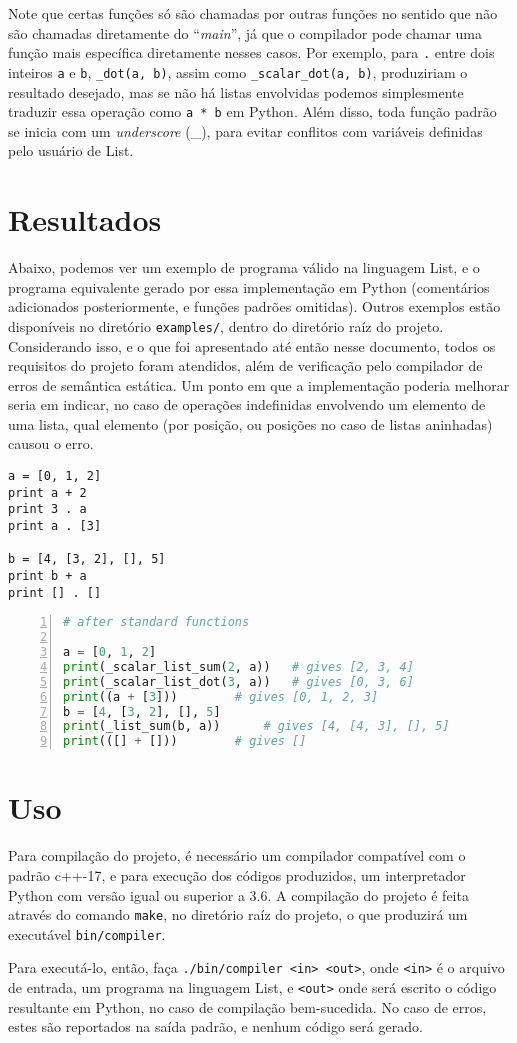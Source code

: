 \documentclass{article}
\begin{document}
Note que certas funções só são chamadas por outras funções no sentido que não são chamadas diretamente do ``\textit{main}'', já que o compilador pode chamar uma função mais específica diretamente nesses casos. Por exemplo, para \texttt{.} entre dois inteiros \texttt{a} e \texttt{b}, \texttt{\_dot(a, b)}, assim como \texttt{\_scalar\_dot(a, b)}, produziriam o resultado desejado, mas se não há listas envolvidas podemos simplesmente traduzir essa operação como \texttt{a * b} em Python. Além disso, toda função padrão se inicia com um \textit{underscore} (\_), para evitar conflitos com variáveis definidas pelo usuário de List.

\section{Resultados}
\label{sec:resultados}
Abaixo, podemos ver um exemplo de programa válido na linguagem List, e o programa equivalente gerado por essa implementação em Python (comentários adicionados posteriormente, e funções padrões omitidas). Outros exemplos estão disponíveis no diretório \texttt{examples/}, dentro do diretório raíz do projeto. Considerando isso, e o que foi apresentado até então nesse documento, todos os requisitos do projeto foram atendidos, além de verificação pelo compilador de erros de semântica estática. Um ponto em que a implementação poderia melhorar seria em indicar, no caso de operações indefinidas envolvendo um elemento de uma lista, qual elemento (por posição, ou posições no caso de listas aninhadas) causou o erro.

\begin{lstlisting}[language=IML]
a = [0, 1, 2]
print a + 2
print 3 . a
print a . [3]

b = [4, [3, 2], [], 5]
print b + a
print [] . []
\end{lstlisting}

\begin{lstlisting}[language=Python, numbers=left, numberstyle=\scriptsize]
# after standard functions

a = [0, 1, 2]
print(_scalar_list_sum(2, a))	# gives [2, 3, 4]
print(_scalar_list_dot(3, a))	# gives [0, 3, 6]
print((a + [3]))		# gives [0, 1, 2, 3]
b = [4, [3, 2], [], 5]
print(_list_sum(b, a))		# gives [4, [4, 3], [], 5]
print(([] + []))		# gives []
\end{lstlisting}

\appendix
\section{Uso}
\label{sec:uso}
Para compilação do projeto, é necessário um compilador compatível com o padrão c++-17, e para execução dos códigos produzidos, um interpretador Python com versão igual ou superior a 3.6. A compilação do projeto é feita através do comando \texttt{make}, no diretório raíz do projeto, o que produzirá um executável \texttt{bin/compiler}.

Para executá-lo, então, faça \texttt{./bin/compiler <in> <out>}, onde \texttt{<in>} é o arquivo de entrada, um programa na linguagem List, e \texttt{<out>} onde será escrito o código resultante em Python, no caso de compilação bem-sucedida. No caso de erros, estes são reportados na saída padrão, e nenhum código será gerado.
\end{document}
